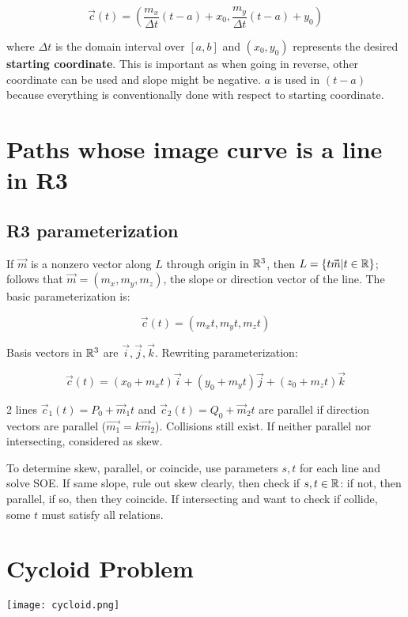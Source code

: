 \[\boxed{\vec{c}(t)=(\frac{m_x}{\Delta t}(t-a)+x_0,\frac{m_y}{\Delta t}(t-a)+y_0)}\]

where $\Delta t$ is the domain interval over $[a,b]$ and $(x_0,y_0)$ represents the desired \textbf{starting coordinate}.
This is important as when going in reverse, other coordinate can be used and slope might be negative.
$a$ is used in $(t-a)$ because everything is conventionally done with respect to starting coordinate.

\section{Paths whose image curve is a line in R3}

\subsection{R3 parameterization}

If $\vec{m}$ is a nonzero vector along $L$ through origin in $\mathbb{R}^3$, then $L=\{t\vec{m}|t\in\mathbb{R}\}$;
follows that $\vec{m}=(m_x,m_y,m_z)$, the slope or direction vector of the line. The basic parameterization is:

\[\vec{c}(t)=(m_x t,m_y t,m_z t)\]

Basis vectors in $\mathbb{R}^3$ are $\vec{i}, \vec{j}, \vec{k}$. Rewriting parameterization: 

\[\vec{c}(t)=(x_0+m_x t) \vec{i}+(y_0+m_y t) \vec{j}+(z_0+m_z t) \vec{k}\]

2 lines $\vec{c}_1(t)=P_0+\vec{m}_1t$ and $\vec{c}_2(t)=Q_0+\vec{m}_2t$ are parallel if
direction vectors are parallel ($\vec{m_1}=k\vec{m}_2$). Collisions still exist. If neither parallel nor intersecting, considered as skew.\newline

\noindent
To determine skew, parallel, or coincide, use parameters $s,t$ for each line and solve SOE.
If same slope, rule out skew clearly, then check if $s,t\in\mathbb{R}$: if not, then parallel, if so, then they coincide. If intersecting and want to check if collide, some $t$
must satisfy all relations.

\section{Cycloid Problem}

\begin{center}
    \texttt{[image: cycloid.png]}
\end{center}

